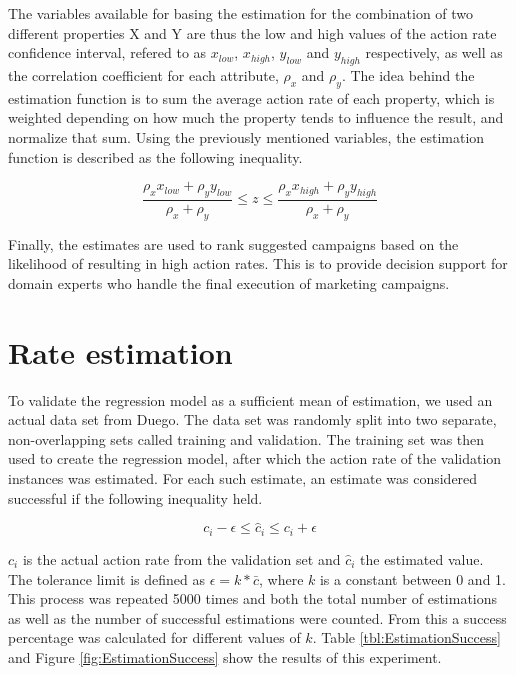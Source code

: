 \documentclass[11pt,a4paper]{report}
\begin{document}
The variables available for basing the estimation for the combination of two different properties X and Y are thus the low and high values of the action rate confidence interval, refered to as \(x_{low}\), \(x_{high}\), \(y_{low}\) and \(y_{high}\) respectively, as well as the correlation coefficient for each attribute, \(\rho_x\) and \(\rho_y\). The idea behind the estimation function is to sum the average action rate of each property, which is weighted depending on how much the property tends to influence the result, and normalize that sum. Using the previously mentioned variables, the estimation function is described as the following inequality.

\begin{equation}
	\frac{\rho_x x_{low} + \rho_y y_{low}}{\rho_x + \rho_y} \leq z \leq \frac{\rho_x x_{high} + \rho_y y_{high}}{\rho_x + \rho_y}
\end{equation}

Finally, the estimates are used to rank suggested campaigns based on the likelihood of resulting in high action rates. This is to provide decision support for domain experts who handle the final execution of marketing campaigns.

\section{Rate estimation}
To validate the regression model as a sufficient mean of estimation, we used an actual data set from Duego. The data set was randomly split into two separate, non-overlapping sets called training and validation. The training set was then used to create the regression model, after which the action rate of the validation instances was estimated. For each such estimate, an estimate was considered successful if the following inequality held.

\[
	c_i - \epsilon \leq \hat{c}_i \leq c_i + \epsilon
\]

\(c_i\) is the actual action rate from the validation set and \(\hat{c}_i\) the estimated value. The tolerance limit is defined as \(\epsilon = k*\bar{c}\), where \(k\) is a constant between 0 and 1. This process was repeated 5000 times and both the total number of estimations as well as the number of successful estimations were counted. From this a success percentage was calculated for different values of \(k\). Table \ref{tbl:EstimationSuccess} and Figure \ref{fig:EstimationSuccess} show the results of this experiment.
\end{document}
